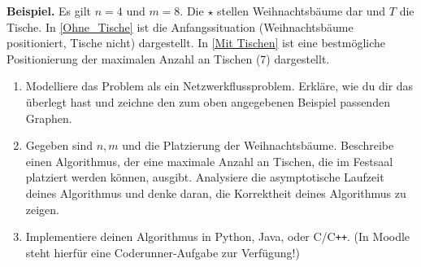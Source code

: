 \documentclass{uebung_cs}
\begin{document}
\begin{exercise}[Weihnachtsbäume]
    \textbf{Beispiel.} Es gilt $n = 4$ und $m = 8$. Die $\star$ stellen Weihnachtsbäume dar und $T$ die Tische. In \cref{Ohne_Tische} ist die Anfangssituation (Weihnachtsbäume positioniert, Tische nicht) dargestellt. In \cref{Mit Tischen} ist eine bestmögliche Positionierung der maximalen Anzahl an Tischen (7) dargestellt.
   
    \begin{enumerate}
    	\item\athome Modelliere das Problem als ein Netzwerkflussproblem. Erkläre, wie du dir das überlegt hast und zeichne den zum oben angegebenen Beispiel passenden Graphen.
    	\item\athome\mittel Gegeben sind $n,m$ und die Platzierung der Weihnachtsbäume. Beschreibe einen Algorithmus, der eine maximale Anzahl an Tischen, die im Festsaal platziert werden können, ausgibt. Analysiere die asymptotische Laufzeit deines Algorithmus und denke daran, die Korrektheit deines Algorithmus zu zeigen.
    	\item\projekt Implementiere deinen Algorithmus in Python, Java, oder C/C\texttt{++}. (In Moodle steht hierfür eine Coderunner-Aufgabe zur Verfügung!)
    \end{enumerate}
\end{exercise}
\end{document}
